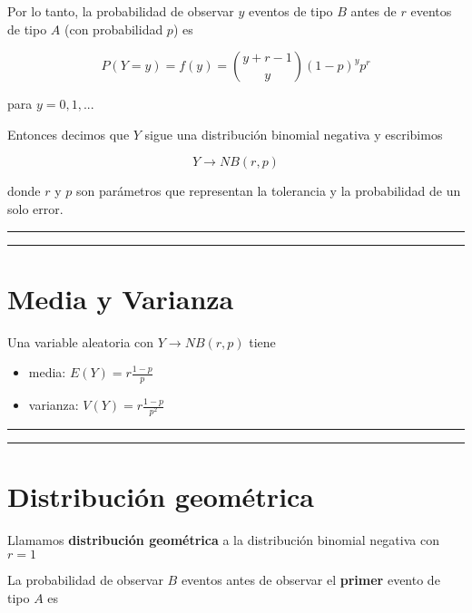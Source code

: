 \documentclass[
]{book}
\begin{document}
Por lo tanto, la probabilidad de observar \(y\) eventos de tipo \(B\) antes de \(r\) eventos de tipo \(A\) (con probabilidad \(p\)) es

\[P(Y=y)=f(y)=\binom {y+r-1} y (1-p)^yp^r\]

para \(y=0,1,...\)

Entonces decimos que \(Y\) sigue una distribución binomial negativa y escribimos

\[Y\rightarrow NB(r,p)\]

donde \(r\) y \(p\) son parámetros que representan la tolerancia y la probabilidad de un solo error.

\begin{center}\rule{0.5\linewidth}{0.5pt}\end{center}

\begin{center}\rule{0.5\linewidth}{0.5pt}\end{center}

\hypertarget{media-y-varianza-2}{%
\section{Media y Varianza}\label{media-y-varianza-2}}

Una variable aleatoria con \(Y\rightarrow NB(r,p)\) tiene

\begin{itemize}
\item
  media: \(E(Y)= r\frac{1-p}{p}\)
\item
  varianza: \(V(Y)= r\frac{1-p}{p^2}\)
\end{itemize}

\begin{center}\rule{0.5\linewidth}{0.5pt}\end{center}

\begin{center}\rule{0.5\linewidth}{0.5pt}\end{center}

\hypertarget{distribuciuxf3n-geomuxe9trica}{%
\section{Distribución geométrica}\label{distribuciuxf3n-geomuxe9trica}}

Llamamos \textbf{distribución geométrica} a la distribución binomial negativa con \(r=1\)

La probabilidad de observar \(B\) eventos antes de observar el \textbf{primer} evento de tipo \(A\) es
\end{document}
